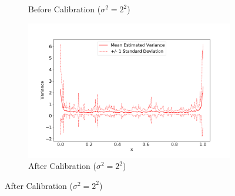 \documentclass[11pt]{article}
\begin{document}
\begin{figure}[htbp]
\begin{subfigure}[b]{0.48\textwidth}
		\caption{Before Calibration ($\sigma^2 = 2^2$)}
		\label{fig:Before_Calibration_2}
	\end{subfigure}
	\hfill
	\begin{subfigure}[b]{0.48\textwidth}
		\centering
		\includegraphics[width=\textwidth]{../figures/Calibration_2.pdf}
		\caption{After Calibration ($\sigma^2 = 2^2$)}
		\label{fig:Calibration_2}
	\end{subfigure}
\end{figure}
\end{document}
